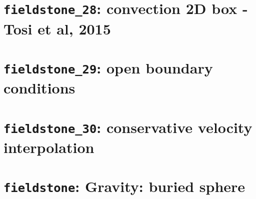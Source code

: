 \documentclass[a4paper]{article}
\begin{document}
\newpage
\section{{\tt fieldstone\_28}: convection 2D box - Tosi et al, 2015 \label{f28}}


\newpage
\section{{\tt fieldstone\_29}: open boundary conditions \label{f29}}


\newpage
\section{{\tt fieldstone\_30}: conservative velocity interpolation \label{f30}}




\newpage
\section{{\tt fieldstone}: Gravity: buried sphere}


\appendix

\newpage
%

\newpage %

\printindex %

\newpage %
\listoftodos[Notes] %
\end{document}
